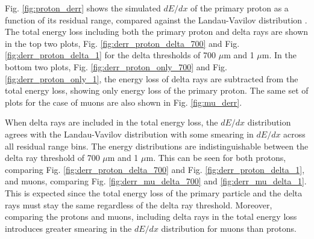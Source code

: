 Fig. \ref{fig:proton_derr} shows the simulated $dE/dx$ of the primary proton as a function of its residual range, compared against the Landau-Vavilov distribution \cite{Passage}.
The total energy loss including both the primary proton and delta rays are shown in the top two plots, Fig. \ref{fig:derr_proton_delta_700} and Fig. \ref{fig:derr_proton_delta_1} for the delta thresholds of 700 $\mu$m and 1 $\mu$m.
In the bottom two plots, Fig. \ref{fig:derr_proton_only_700} and Fig. \ref{fig:derr_proton_only_1}, the energy loss of delta rays are subtracted from the total energy loss, showing only energy loss of the primary proton.
The same set of plots for the case of muons are also shown in Fig. \ref{fig:mu_derr}.

When delta rays are included in the total energy loss, the $dE/dx$ distribution agrees with the Landau-Vavilov distribution with some smearing in $dE/dx$ across all residual range bins.
The energy distributions are indistinguishable between the delta ray threshold of 700 $\mu$m and 1 $\mu$m.
This can be seen for both protons, comparing Fig. \ref{fig:derr_proton_delta_700} and Fig. \ref{fig:derr_proton_delta_1}, and muons, comparing Fig. \ref{fig:derr_mu_delta_700} and \ref{fig:derr_mu_delta_1}. 
This is expected since the total energy loss of the primary particle and the delta rays must stay the same regardless of the delta ray threshold.
Moreover, comparing the protons and muons, including delta rays in the total energy loss introduces greater smearing in the $dE/dx$ distribution for muons than protons.

